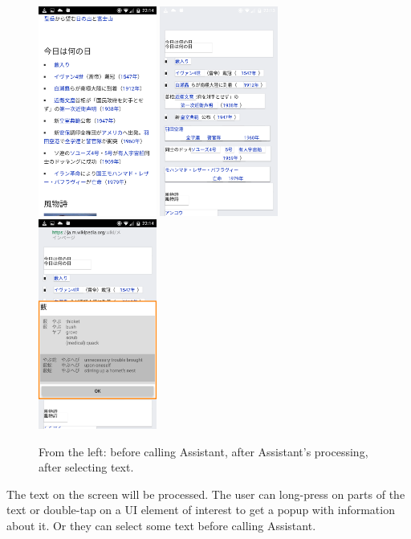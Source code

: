 \documentclass[11pt,a4paper]{article}
\begin{document}
\begin{figure}[h]
\includegraphics[width=110pt]{screen_3.png}
\includegraphics[width=110pt]{screen_1.png}
\includegraphics[width=110pt]{screen_2.png}

From the left: before calling Assistant, after Assistant's processing,
after selecting text.
\end{figure}

The text on the screen will be processed. %
The user can long-press on parts of the text
or double-tap on a UI element of interest
to get a popup with information about it.
Or they can select some text before calling Assistant.
\end{document}
